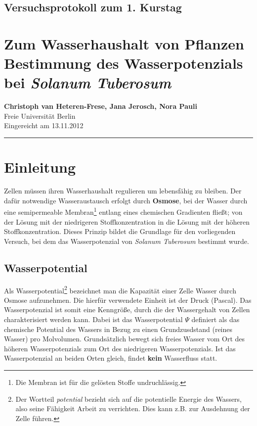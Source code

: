 \documentclass[11pt,a4paper,DIV=10,]{scrartcl}
\begin{document}
\onecolumn
\subsection*{Versuchsprotokoll zum 1. Kurstag }
\section*{Zum Wasserhaushalt von Pflanzen\\Bestimmung des Wasserpotenzials bei \textit{Solanum Tuberosum}}
\textbf{Christoph van Heteren-Frese\footnotemark[1], Jana Jerosch\footnotemark[1], Nora Pauli\footnotemark[1]} \\[0.1cm]
\footnotemark[1]Freie Universität Berlin\\[0.2cm]
Eingereicht am 13.11.2012\\
\hrule

\section*{Einleitung}    
Zellen müssen ihren Wasserhaushalt regulieren um lebensfähig zu bleiben. Der dafür notwendige Wasseraustausch erfolgt durch \textbf{Osmose}, bei der Wasser durch eine semipermeable Membran\footnote{Die Membran ist für die gelösten Stoffe undruchlässig.}  entlang eines chemischen Gradienten fließt; von der Lösung mit der niedrigeren Stoffkonzentration in die Lösung mit der höheren Stoffkonzentration. Dieses Prinzip bildet die Grundlage für den vorliegenden Versuch, bei dem das Wasserpotenzial von \textit{Solanum Tuberosum} bestimmt wurde. 

\subsection*{Wasserpotential}
Als Wasserpotential\footnote{Der Wortteil \textit{potential} bezieht sich auf die potentielle Energie des Wassers, also seine Fähigkeit Arbeit zu verrichten. Dies kann z.B. zur Ausdehnung der Zelle führen.} bezeichnet man die Kapazität einer Zelle Wasser durch Osmose aufzunehmen. Die hierfür verwendete Einheit ist der Druck (Pascal). Das Wasserpotenzial ist somit eine Kenngröße, durch die der Wassergehalt von Zellen charakterisiert werden kann. Dabei ist das Wasserpotential $\Psi$ definiert als das chemische Potential des Wassers in Bezug zu einen Grundzusdstand (reines Wasser) pro Molvolumen. Grundsätzlich bewegt sich freies Wasser vom Ort des höheren Wasserpotenzials zum Ort des niedrigeren Wasserpotenzials. Ist das Wasserpotenzial an beiden Orten gleich, findet \textbf{kein} Wasserfluss statt.
\end{document}
